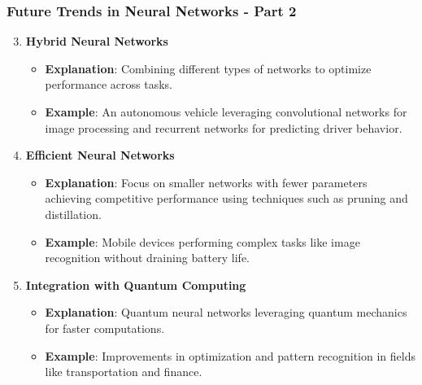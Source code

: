 \documentclass[aspectratio=169]{beamer}
\begin{document}
\begin{frame}[fragile]
    \frametitle{Future Trends in Neural Networks - Part 2}
    \begin{enumerate}
        \setcounter{enumi}{2}
        \item \textbf{Hybrid Neural Networks}
            \begin{itemize}
                \item \textbf{Explanation}: Combining different types of networks to optimize performance across tasks.
                \item \textbf{Example}: An autonomous vehicle leveraging convolutional networks for image processing and recurrent networks for predicting driver behavior.
            \end{itemize}

        \item \textbf{Efficient Neural Networks}
            \begin{itemize}
                \item \textbf{Explanation}: Focus on smaller networks with fewer parameters achieving competitive performance using techniques such as pruning and distillation.
                \item \textbf{Example}: Mobile devices performing complex tasks like image recognition without draining battery life.
            \end{itemize}
            
        \item \textbf{Integration with Quantum Computing}
            \begin{itemize}
                \item \textbf{Explanation}: Quantum neural networks leveraging quantum mechanics for faster computations.
                \item \textbf{Example}: Improvements in optimization and pattern recognition in fields like transportation and finance.
            \end{itemize}
    \end{enumerate}
\end{frame}
\end{document}
